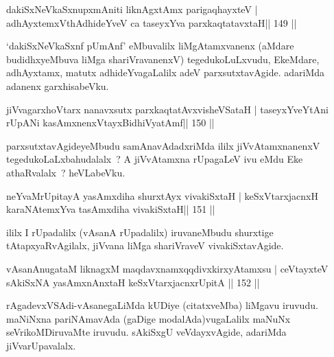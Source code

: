 
\begin{shl}
dakiSxNeV\s kaSxnupxmAniti liknAgxtAmx parigaqhayxteV |
adhAyxtemxV\s thAdhideYveV ca taseyxYva parxkaqtatavxtaH\hfill || 149 ||
\end{shl}

\begin{artha}
`dakiSxNeV\s kaSxnf pUmAnf' eMbuvalilx liMgAtamxvanenx (aMdare budidhxyeMbuva liMga shariVravanenxV) tegedukoLuLxvudu, EkeMdare, adhAyxtamx, matutx adhideYvagaLalilx adeV parxsutxtavAgide. adariMda adanenx garxhisabeVku.
\end{artha}

\begin{shl}
jiVvagarxhoV\s tarx nanavxsutx parxkaqtatAvxvisheVSataH |
taseyxYveYtAni rUpANi kasAmxnenxVtayxBidhiVyatAmf\hfill || 150 ||
\end{shl}

\begin{artha}
parxsutxtavAgideyeMbudu samAnavAdadxriMda ililx jiVvAtamxnanenxV tegedukoLaLxbahudalalx~? A jiVvAtamxna rUpagaLeV ivu eMdu Eke  athaRvalalx~? heVLabeVku.
\end{artha}

\begin{shl}
neYvaMrUpitayA yasAmxdiha shurxtAyx vivakiSxtaH |
keSxVtarxjacnxH karaNAtemxYva tasAmxdiha vivakiSxtaH\hfill || 151 ||
\end{shl}

\begin{artha}
ililx I rUpadalilx (vAsanA rUpadalilx) iruvaneMbudu shurxtige
tAtapxyaRvAgilalx, jiVvana liMga shariVraveV vivakiSxtavAgide.
\end{artha}


\begin{shl}
vAsanAnugataM liknagxM maqdavxnamxqqdivxkirxyAtamxsu |
ceVtayxteV sAkiSxNA yasAmxnAnxtaH keSxVtarxjacnxrUpitA \hfill || 152 ||
\end{shl}

\begin{artha}
rAgadevxVSAdi-vAsanegaLiMda kUDiye (citatxveMba) liMgavu iruvudu. maNiNxna pariNAmavAda (gaDige modalAda)vugaLalilx maNuNx seVrikoMDiruvaMte iruvudu. sAkiSxgU veVdayxvAgide, adariMda jiVvarUpavalalx.
\end{artha}

